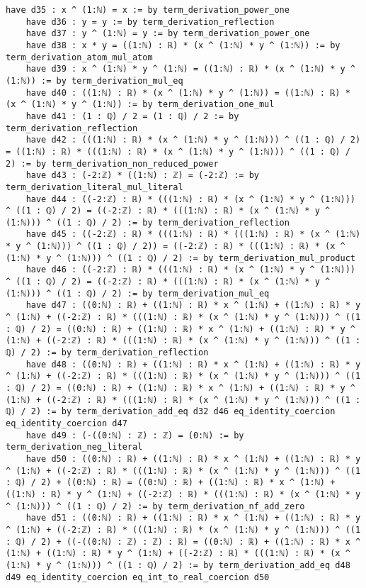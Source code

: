 \documentclass{article}
\begin{document}
\begin{tcolorbox}[colback=white!10, width=\linewidth]
\begin{lstlisting}[language=Lean4]
    have d35 : x ^ (1:ℕ) = x := by term_derivation_power_one
    have d36 : y = y := by term_derivation_reflection
    have d37 : y ^ (1:ℕ) = y := by term_derivation_power_one
    have d38 : x * y = ((1:ℕ) : ℝ) * (x ^ (1:ℕ) * y ^ (1:ℕ)) := by term_derivation_atom_mul_atom
    have d39 : x ^ (1:ℕ) * y ^ (1:ℕ) = ((1:ℕ) : ℝ) * (x ^ (1:ℕ) * y ^ (1:ℕ)) := by term_derivation_mul_eq
    have d40 : ((1:ℕ) : ℝ) * (x ^ (1:ℕ) * y ^ (1:ℕ)) = ((1:ℕ) : ℝ) * (x ^ (1:ℕ) * y ^ (1:ℕ)) := by term_derivation_one_mul
    have d41 : (1 : ℚ) / 2 = (1 : ℚ) / 2 := by term_derivation_reflection
    have d42 : (((1:ℕ) : ℝ) * (x ^ (1:ℕ) * y ^ (1:ℕ))) ^ ((1 : ℚ) / 2) = ((1:ℕ) : ℝ) * (((1:ℕ) : ℝ) * (x ^ (1:ℕ) * y ^ (1:ℕ))) ^ ((1 : ℚ) / 2) := by term_derivation_non_reduced_power
    have d43 : (-2:ℤ) * ((1:ℕ) : ℤ) = (-2:ℤ) := by term_derivation_literal_mul_literal
    have d44 : ((-2:ℤ) : ℝ) * (((1:ℕ) : ℝ) * (x ^ (1:ℕ) * y ^ (1:ℕ))) ^ ((1 : ℚ) / 2) = ((-2:ℤ) : ℝ) * (((1:ℕ) : ℝ) * (x ^ (1:ℕ) * y ^ (1:ℕ))) ^ ((1 : ℚ) / 2) := by term_derivation_reflection
    have d45 : ((-2:ℤ) : ℝ) * (((1:ℕ) : ℝ) * (((1:ℕ) : ℝ) * (x ^ (1:ℕ) * y ^ (1:ℕ))) ^ ((1 : ℚ) / 2)) = ((-2:ℤ) : ℝ) * (((1:ℕ) : ℝ) * (x ^ (1:ℕ) * y ^ (1:ℕ))) ^ ((1 : ℚ) / 2) := by term_derivation_mul_product
    have d46 : ((-2:ℤ) : ℝ) * (((1:ℕ) : ℝ) * (x ^ (1:ℕ) * y ^ (1:ℕ))) ^ ((1 : ℚ) / 2) = ((-2:ℤ) : ℝ) * (((1:ℕ) : ℝ) * (x ^ (1:ℕ) * y ^ (1:ℕ))) ^ ((1 : ℚ) / 2) := by term_derivation_mul_eq
    have d47 : ((0:ℕ) : ℝ) + ((1:ℕ) : ℝ) * x ^ (1:ℕ) + ((1:ℕ) : ℝ) * y ^ (1:ℕ) + ((-2:ℤ) : ℝ) * (((1:ℕ) : ℝ) * (x ^ (1:ℕ) * y ^ (1:ℕ))) ^ ((1 : ℚ) / 2) = ((0:ℕ) : ℝ) + ((1:ℕ) : ℝ) * x ^ (1:ℕ) + ((1:ℕ) : ℝ) * y ^ (1:ℕ) + ((-2:ℤ) : ℝ) * (((1:ℕ) : ℝ) * (x ^ (1:ℕ) * y ^ (1:ℕ))) ^ ((1 : ℚ) / 2) := by term_derivation_reflection
    have d48 : ((0:ℕ) : ℝ) + ((1:ℕ) : ℝ) * x ^ (1:ℕ) + ((1:ℕ) : ℝ) * y ^ (1:ℕ) + ((-2:ℤ) : ℝ) * (((1:ℕ) : ℝ) * (x ^ (1:ℕ) * y ^ (1:ℕ))) ^ ((1 : ℚ) / 2) = ((0:ℕ) : ℝ) + ((1:ℕ) : ℝ) * x ^ (1:ℕ) + ((1:ℕ) : ℝ) * y ^ (1:ℕ) + ((-2:ℤ) : ℝ) * (((1:ℕ) : ℝ) * (x ^ (1:ℕ) * y ^ (1:ℕ))) ^ ((1 : ℚ) / 2) := by term_derivation_add_eq d32 d46 eq_identity_coercion eq_identity_coercion d47
    have d49 : (-((0:ℕ) : ℤ) : ℤ) = (0:ℕ) := by term_derivation_neg_literal
    have d50 : ((0:ℕ) : ℝ) + ((1:ℕ) : ℝ) * x ^ (1:ℕ) + ((1:ℕ) : ℝ) * y ^ (1:ℕ) + ((-2:ℤ) : ℝ) * (((1:ℕ) : ℝ) * (x ^ (1:ℕ) * y ^ (1:ℕ))) ^ ((1 : ℚ) / 2) + ((0:ℕ) : ℝ) = ((0:ℕ) : ℝ) + ((1:ℕ) : ℝ) * x ^ (1:ℕ) + ((1:ℕ) : ℝ) * y ^ (1:ℕ) + ((-2:ℤ) : ℝ) * (((1:ℕ) : ℝ) * (x ^ (1:ℕ) * y ^ (1:ℕ))) ^ ((1 : ℚ) / 2) := by term_derivation_nf_add_zero
    have d51 : ((0:ℕ) : ℝ) + ((1:ℕ) : ℝ) * x ^ (1:ℕ) + ((1:ℕ) : ℝ) * y ^ (1:ℕ) + ((-2:ℤ) : ℝ) * (((1:ℕ) : ℝ) * (x ^ (1:ℕ) * y ^ (1:ℕ))) ^ ((1 : ℚ) / 2) + ((-((0:ℕ) : ℤ) : ℤ) : ℝ) = ((0:ℕ) : ℝ) + ((1:ℕ) : ℝ) * x ^ (1:ℕ) + ((1:ℕ) : ℝ) * y ^ (1:ℕ) + ((-2:ℤ) : ℝ) * (((1:ℕ) : ℝ) * (x ^ (1:ℕ) * y ^ (1:ℕ))) ^ ((1 : ℚ) / 2) := by term_derivation_add_eq d48 d49 eq_identity_coercion eq_int_to_real_coercion d50

\end{lstlisting}
\end{tcolorbox}
\end{document}
